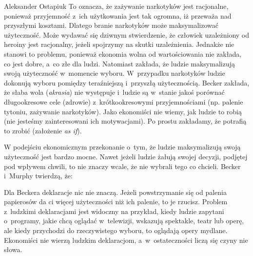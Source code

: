 \begin{artplenv}{Aleksander Ostapiuk}
To oznacza, że zażywanie narkotyków jest racjonalne, ponieważ przyjemność z~ich użytkowania jest tak ogromna, iż
przeważa nad przyszłymi kosztami. Dlatego branie narkotyków może maksymalizować użyteczność. Może wydawać się dziwnym
stwierdzenie, że człowiek uzależniony od heroiny jest racjonalny, jeżeli spojrzymy na skutki uzależnienia. Jednakże nie stanowi
to problemu, ponieważ ekonomia wolna od wartościowania nie zakłada, co jest dobre, a~co złe dla ludzi. Natomiast
zakłada, że ludzie maksymalizują swoją użyteczność w~momencie wyboru. W~przypadku narkotyków ludzie dokonują wyboru
pomiędzy teraźniejszą i~przyszłą użytecznością. Becker zakłada, że słaba wola (\textit{akrasia}) nie występuje i~ludzie
są w~stanie jakoś porównać długookresowe cele (zdrowie) z~krótkookresowymi przyjemnościami (np. palenie tytoniu,
zażywanie narkotyków). Jako ekonomiści
nie wiemy, jak ludzie to robią (nie jesteśmy zainteresowani ich motywacjami). Po prostu zakładamy, że potrafią to
zrobić (założenie \textit{as if}). 

W podejściu ekonomicznym przekonanie o~tym, że ludzie maksymalizują swoją użyteczność jest bardzo mocne. Nawet jeżeli
ludzie żałują swojej decyzji, podjętej pod wpływem chwili, to nie znaczy wcale, że nie wybrali tego co chcieli. Becker
i~Murphy twierdzą, że:


Dla Beckera deklaracje nic nie znaczą. Jeżeli powstrzymanie się od palenia papierosów da ci więcej użyteczności niż ich palenie, to
je rzucisz. Problem z~ludzkimi deklaracjami jest widoczny na przykład, kiedy ludzie zapytani o~programy, jakie chcą
oglądać w~telewizji, wskazują spektakle, teatr lub operę, ale kiedy przychodzi do rzeczywistego wyboru, to oglądają
opery mydlane. Ekonomiści nie wierzą ludzkim deklaracjom, a~w~ostateczności liczą się czyny nie słowa.


\end{artplenv}

